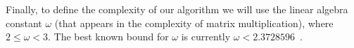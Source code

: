 Finally, to define the complexity of our algorithm we will use the linear algebra constant $\omega$ (that appears in the complexity of matrix multiplication), where \(2 \le \omega < 3\). The best known bound for $\omega$ is currently $\omega < 2.3728596$~\cite{DBLP:conf/issac/Gall14a}.










